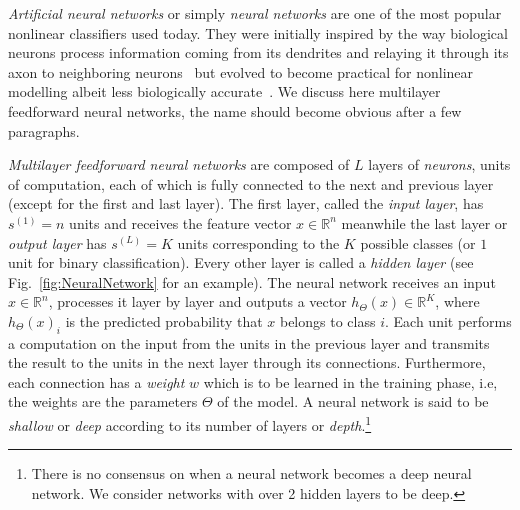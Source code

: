 \emph{Artificial neural networks} or simply \emph{neural networks} are one of the most popular nonlinear classifiers used today. They were initially inspired by the way biological neurons process information coming from its dendrites and relaying it through its axon to neighboring neurons~\cite{McCulloch1943, Widrow1960, Rosenblatt1962} but evolved to become practical for nonlinear modelling albeit less biologically accurate~\cite{Rumelhart1986}. We discuss here multilayer feedforward neural networks, the name should become obvious after a few paragraphs.

\emph{Multilayer feedforward neural networks} are composed of $L$ layers of \emph{neurons}, units of computation, each of which is fully connected to the next and previous layer (except for the first and last layer). The first layer, called the \emph{input layer}, has $s^{(1)} = n$ units and receives the feature vector $x \in \mathbb{R}^n$ meanwhile the last layer or \emph{output layer} has $s^{(L)} = K$ units corresponding to the $K$ possible classes (or $1$ unit for binary classification). Every other layer is called a \emph{hidden layer} (see Fig.~\ref{fig:NeuralNetwork} for an example). The neural network receives an input $x \in \mathbb{R}^n$, processes it layer by layer and outputs a vector $h_\Theta(x) \in \mathbb{R}^K$, where $h_\Theta(x)_i$ is the predicted probability that $x$ belongs to class $i$. Each unit performs a computation on the input from the units in the previous layer and transmits the result to the units in the next layer through its connections. Furthermore, each connection has a \emph{weight} $w$ which is to be learned in the training phase, i.e, the weights are the parameters $\Theta$ of the model. A neural network is said to be \emph{shallow} or \emph{deep} according to its number of layers or \emph{depth}.\footnote{There is no consensus on when a neural network becomes a deep neural network\cite{Schmidhuber2015}. We consider networks with over 2 hidden layers to be deep.}

